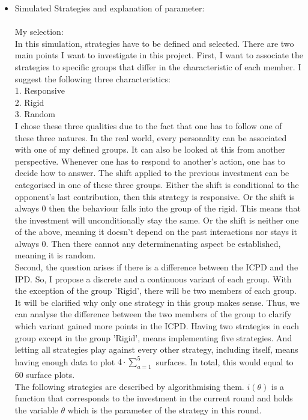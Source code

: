 \documentclass{article}
\begin{document}
\begin{itemize}
	\item Simulated Strategies and explanation of parameter:\\
		\\My selection:\\
In this simulation, strategies have to be defined and selected.
There are two main points I want to investigate in this project.
First, I want to associate the strategies to specific groups that differ in the characteristic of each member.
I suggest the following three characteristics:
\\1. Responsive
\\2. Rigid
\\3. Random\\
I chose these three qualities due to the fact that one has to follow one of these three natures.
In the real world, every personality can be associated with one of my defined groups.
It can also be looked at this from another perspective.
Whenever one has to respond to another's action, one has to decide how to answer.
The shift applied to the previous investment can be categorised in one of these three groups.
Either the shift is conditional to the opponent's last contribution, then this strategy is responsive.
Or the shift is always 0 then the behaviour falls into the group of the rigid.
This means that the investment will unconditionally stay the same.
Or the shift is neither one of the above, meaning it doesn't depend on the past interactions nor stays it always 0.
Then there cannot any determinenating aspect be established, meaning it is random.
\\Second, the question arises if there is a difference between the ICPD and the IPD.
So, I propose a discrete and a continuous variant of each group.
With the exception of the group 'Rigid', there will be two members of each group.
It will be clarified why only one strategy in this group makes sense.
Thus, we can analyse the difference between the two members of the group to clarify which variant gained more points in the ICPD.
Having two strategies in each group except in the group 'Rigid', means implementing five strategies.
And letting all strategies play against every other strategy, including itself, means having enough data to plot $4 \cdot \sum_{a=1}^{5}$ surfaces.
In total, this would equal to 60 surface plots.\\
The following strategies are described by algorithmising them.
$i(\theta)$ is a function that corresponds to the investment in the current round and holds the variable $\theta$ which is the parameter of the strategy in this round.

\end{itemize}
\end{document}
